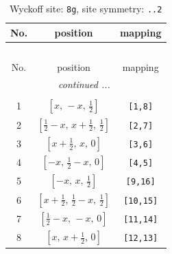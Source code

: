 \documentclass[fleqn,8pt]{jsarticle}
\begin{document}
\renewcommand{\arraystretch}{1.2}
\begin{longtable}{ccc}
\caption{Wyckoff site: {\tt 8g}, site symmetry: {\tt ..2}}
 \\
 \hline \hline
No. & position & mapping \\ \hline \endfirsthead

\multicolumn{2}{l}{\tablename\ \thetable{}} \\
 \hline \hline
No. & position & mapping \\ \hline \endhead

 \hline \hline
\multicolumn{2}{r}{\footnotesize\it continued ...} \\ \endfoot

 \hline \hline
\multicolumn{2}{r}{} \\ \endlastfoot

1 & $\left[ x,\, - x,\, \frac{1}{2} \right]$ & {\tt [1,8]} \\ \hline
2 & $\left[ \frac{1}{2} - x,\, x + \frac{1}{2},\, \frac{1}{2} \right]$ & {\tt [2,7]} \\ \hline
3 & $\left[ x + \frac{1}{2},\, x,\, 0 \right]$ & {\tt [3,6]} \\ \hline
4 & $\left[ - x,\, \frac{1}{2} - x,\, 0 \right]$ & {\tt [4,5]} \\ \hline
5 & $\left[ - x,\, x,\, \frac{1}{2} \right]$ & {\tt [9,16]} \\ \hline
6 & $\left[ x + \frac{1}{2},\, \frac{1}{2} - x,\, \frac{1}{2} \right]$ & {\tt [10,15]} \\ \hline
7 & $\left[ \frac{1}{2} - x,\, - x,\, 0 \right]$ & {\tt [11,14]} \\ \hline
8 & $\left[ x,\, x + \frac{1}{2},\, 0 \right]$ & {\tt [12,13]} \\
\end{longtable}
\renewcommand{\arraystretch}{1.2}
\end{document}
